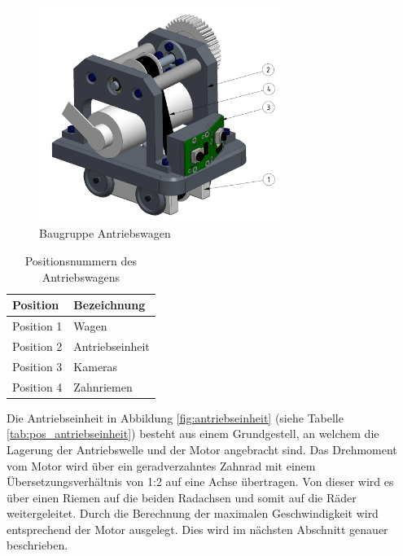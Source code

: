\documentclass[../../main.tex]{subfiles}
\begin{document}
    \begin{figure}[H] %
        \centering
        \includegraphics[width=0.7\textwidth]{antriebswagen.png}
        \caption{Baugruppe Antriebswagen}
        \label{fig:antriebswagen}
    \end{figure}

    \begin{table}[H] \centering
        \begin{tabular}{|l|l|}
        \hline
        \textbf{Position} & \textbf{Bezeichnung}\\
        \hline
        Position 1          & Wagen\\
         \hline
        Position 2          & Antriebseinheit\\
        \hline
        Position 3          & Kameras\\
        \hline
        Position 4          & Zahnriemen\\
        \hline
    \end{tabular}

    \caption{Positionsnummern des Antriebswagens}
    \label{tab:expl_antriebswagen}
    \end{table}

    \pagebreak

    Die Antriebseinheit in Abbildung \ref{fig:antriebseinheit} (siehe Tabelle \ref{tab:pos_antriebseinheit}) besteht aus einem Grundgestell, an welchem die Lagerung der Antriebswelle und der Motor angebracht sind. Das Drehmoment vom Motor wird über ein geradverzahntes Zahnrad mit einem Übersetzungsverhältnis von 1:2 auf eine Achse übertragen. Von dieser wird es über einen Riemen auf die beiden Radachsen und somit auf die Räder weitergeleitet. Durch die Berechnung der maximalen Geschwindigkeit wird entsprechend der Motor ausgelegt. Dies wird im nächsten Abschnitt genauer beschrieben.\\
\end{document}
